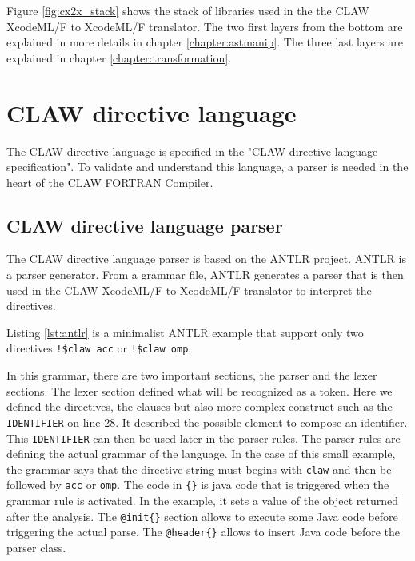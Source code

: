 \documentclass[a4paper, 11pt]{report}
\def\clawfcomp{CLAW FORTRAN Compiler\xspace}
\def\xcodeml{XcodeML/F\xspace}
\begin{document}
Figure \ref{fig:cx2x_stack} shows the stack of libraries used in the the CLAW \xcodeml to \xcodeml translator. The two first layers from the bottom are explained in more details in chapter \ref{chapter:astmanip}. The three last layers are explained in chapter \ref{chapter:transformation}.


\chapter{CLAW directive language}
The CLAW directive language is specified in the "CLAW directive language specification". To validate and understand this language, a parser is needed in the heart of the \clawfcomp.

\section{CLAW directive language parser}
The CLAW directive language parser is based on the ANTLR project\cite{Parr:2013:DAR:2501720}. ANTLR is a parser generator. From a grammar file, ANTLR generates a parser that is then used in the CLAW \xcodeml to \xcodeml translator to interpret the directives. 



Listing \ref{lst:antlr} is a minimalist ANTLR example that support only two directives \lstinline|!$claw acc| or \lstinline|!$claw omp|.

In this grammar, there are two important sections, the parser and the lexer sections. The lexer section defined what will be recognized as a token. Here we defined the directives, the clauses but also more complex construct such as the \lstinline|IDENTIFIER| on line 28. It described the possible element to compose an identifier. This \lstinline|IDENTIFIER| can then be used later in the parser rules. 
The parser rules are defining the actual grammar of the language. In the case of this small example, the grammar says that the directive string must begins with \lstinline|claw| and then be followed by \lstinline|acc| or \lstinline|omp|. The code in \lstinline|{}| is java code that is triggered when the grammar rule is activated. In the example, it sets a value of the object returned after the analysis.
The \lstinline|@init{}| section allows to execute some Java code before triggering the actual parse. The \lstinline|@header{}| allows to insert Java code before the parser class.
\end{document}
